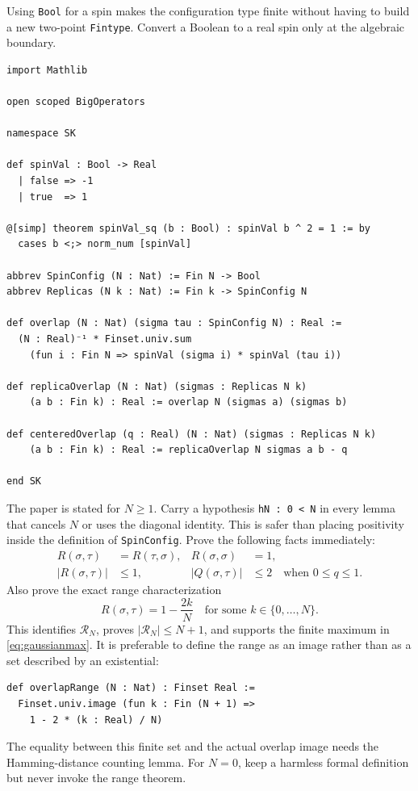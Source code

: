 \documentclass[11pt]{article}
\numberwithin{equation}{section}
\newcommand{\1}{\mathbf 1}
\begin{document}
Using \texttt{Bool} for a spin makes the configuration type finite without
having to build a new two-point \texttt{Fintype}.  Convert a Boolean to a
real spin only at the algebraic boundary.
\begin{lstlisting}
import Mathlib

open scoped BigOperators

namespace SK

def spinVal : Bool -> Real
  | false => -1
  | true  => 1

@[simp] theorem spinVal_sq (b : Bool) : spinVal b ^ 2 = 1 := by
  cases b <;> norm_num [spinVal]

abbrev SpinConfig (N : Nat) := Fin N -> Bool
abbrev Replicas (N k : Nat) := Fin k -> SpinConfig N

def overlap (N : Nat) (sigma tau : SpinConfig N) : Real :=
  (N : Real)⁻¹ * Finset.univ.sum
    (fun i : Fin N => spinVal (sigma i) * spinVal (tau i))

def replicaOverlap (N : Nat) (sigmas : Replicas N k)
    (a b : Fin k) : Real := overlap N (sigmas a) (sigmas b)

def centeredOverlap (q : Real) (N : Nat) (sigmas : Replicas N k)
    (a b : Fin k) : Real := replicaOverlap N sigmas a b - q

end SK
\end{lstlisting}

The paper is stated for $N\ge1$.  Carry a hypothesis \texttt{hN : 0 < N}
in every lemma that cancels $N$ or uses the diagonal identity.  This is
safer than placing positivity inside the definition of
\texttt{SpinConfig}.  Prove the following facts immediately:
\begin{align*}
R(\sigma,\tau)&=R(\tau,\sigma),&
R(\sigma,\sigma)&=1,\\
|R(\sigma,\tau)|&\le1,&
|Q(\sigma,\tau)|&\le2
\quad\text{when }0\le q\le1.
\end{align*}
Also prove the exact range characterization
\[
 R(\sigma,\tau)=1-\frac{2k}{N}
 \quad\text{for some }k\in\{0,\ldots,N\}.
\]
This identifies $\mathcal R_N$, proves $|\mathcal R_N|\le N+1$, and
supports the finite maximum in \eqref{eq:gaussianmax}.  It is preferable to
define the range as an image rather than as a set described by an
existential:
\begin{lstlisting}
def overlapRange (N : Nat) : Finset Real :=
  Finset.univ.image (fun k : Fin (N + 1) =>
    1 - 2 * (k : Real) / N)
\end{lstlisting}
The equality between this finite set and the actual overlap image needs the
Hamming-distance counting lemma.  For $N=0$, keep a harmless formal
definition but never invoke the range theorem.
\end{document}
